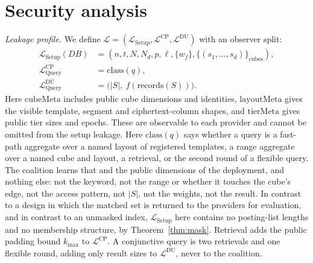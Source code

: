\documentclass[a4paper,fleqn]{cas-sc}
\newcommand{\Leak}{\mathcal{L}}
\begin{document}
\section{Security analysis}
\label{sec:security}

\emph{Leakage profile.} We define
$\Leak=(\Leak_{\mathrm{Setup}},\Leak^{\text{CP}},\Leak^{\text{DU}})$ with an
observer split:
\begin{align*}
\Leak_{\mathrm{Setup}}(DB) &= (n,t,N,N_d,p,\ell,\{w_f\},\{(s_1,\dots,s_d)\}_{\text{cubes}}),\\
\Leak^{\text{CP}}_{\mathrm{Query}} &= \mathrm{class}(q),\\
\Leak^{\text{DU}}_{\mathrm{Query}} &= \big(|S|,\ f(\mathrm{records}(S))\big).
\end{align*}
Here $\mathrm{cubeMeta}$ includes public cube dimensions and identities,
$\mathrm{layoutMeta}$ gives the visible template, segment and ciphertext-column
shapes, and $\mathrm{tierMeta}$ gives public tier sizes and epochs.
These are observable to each provider and cannot be omitted from the
setup leakage. Here $\mathrm{class}(q)$ says whether a query is a fast-path aggregate over a
named layout of registered templates, a range aggregate over a named cube and
layout, a retrieval, or the second round of a flexible query. The coalition
learns that and the public dimensions of the deployment, and nothing else: not
the keyword, not the range or whether it touches the cube's edge, not the
access pattern, not $|S|$, not the weights, not the result. In contrast to a design in which
the matched set is returned to the providers for evaluation, and in contrast
to an unmasked index, $\Leak_{\mathrm{Setup}}$ here contains no posting-list
lengths and no membership structure, by Theorem~\ref{thm:mask}. Retrieval adds
the public padding bound $k_{\max}$ to $\Leak^{\text{CP}}$. A conjunctive
query is two retrievals and one flexible round, adding only result sizes to
$\Leak^{\text{DU}}$, never to the coalition.
\end{document}
